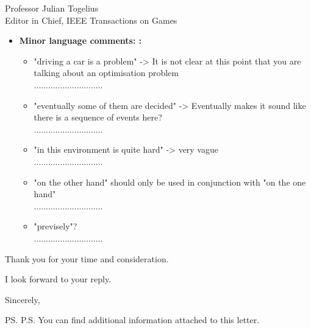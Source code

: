 \documentclass[10pt]{letter} %
\begin{document}
\begin{letter}{Professor Julian Togelius \\ Editor in Chief, IEEE Transactions on Games}
\begin{enumerate}
\begin{itemize}
	\item {\bf Minor language comments: :} 
				\begin{itemize}
				\item 	"driving a car is a problem" -> It is not clear at this point that you are talking about an optimisation problem\\
.............................
				\item 	"eventually some of them are decided" -> Eventually makes it sound like there is a sequence of events here?\\
.............................
	

				\item 	"in this environment is quite hard" -> very vague\\
.............................

				\item 	"on the other hand" should only be used in conjunction with "on the one hand"\\
.............................
				\item 	"previsely"?\\
.............................
			
			\end{itemize}
	
\end{itemize}
\end{enumerate}
 




Thank you for your time and consideration.

I look forward to your reply.

\vspace{2\parskip} %
\closing{Sincerely,}
\vspace{2\parskip} %

\ps{P.S. You can find additional information attached to this letter.} %



\end{letter}
 
\end{document}
